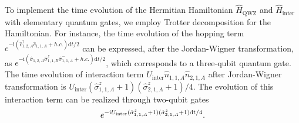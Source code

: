 \documentclass[longbibliography, aps, prx, amsmath, amssymb, amsfonts, twocolumn,superscriptaddress, footinbib]{revtex4-1}
\begin{document}
	To implement the time evolution of the Hermitian Hamiltonian $\hat{H}_{\text{QWZ}}$ and $\hat{H}_{\text{inter}}$ with elementary quantum gates, we employ Trotter decomposition for the Hamiltonian. For instance, the time evolution of the hopping term $e^{-\mathrm{i}  (\hat{c}_{1,2,A}^{\dagger} \hat{c}_{1,1,A} +h.c.)\mathrm{d} t/2}$ can be expressed, after the Jordan-Wigner transformation, as $e^{-\mathrm{i} (\hat{\sigma}_{1,2,A} \hat{\sigma}^z_{1,1,B}\hat{\sigma}_{1,1,A}^{-} +h.c.)\mathrm{d} t /2}$, which corresponds to a three-qubit quantum gate.
	The time evolution of interaction term $ U_{\text{inter}} \hat{n}_{1, 1, A} \hat{n}_{2,1,A}$ after Jordan-Wigner transformation is $U_{\text{inter}} (\hat{\sigma}^z_{1,1,A}+1)(\hat{\sigma}^z_{2,1,A}+1)/4$. The evolution of this interaction term can be realized through two-qubit gates 
	\begin{equation}
		e^{-\mathrm{i} U_{\text{inter}} (\hat{\sigma}^z_{1,1,A}+1) (\hat{\sigma}^z_{2,1,A}+1) \mathrm{d}t/4 }. \notag
	\end{equation}
\end{document}
